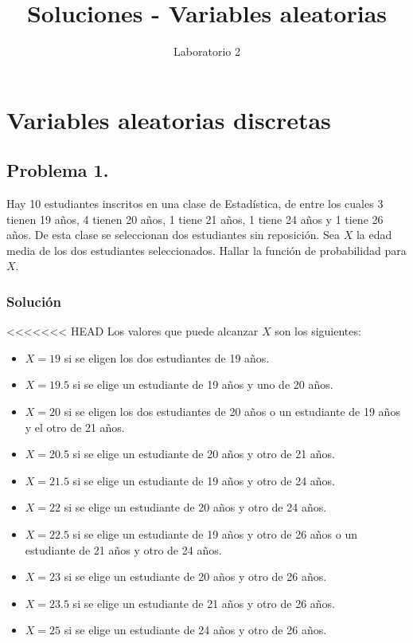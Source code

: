 \documentclass[
]{article}
\title{Soluciones - Variables aleatorias}
\author{}
\date{Laboratorio 2}
\providecommand{\tightlist}{%
  \setlength{\itemsep}{0pt}\setlength{\parskip}{0pt}}
\begin{document}
\maketitle

{
\hypersetup{linkcolor=blue}
\setcounter{tocdepth}{4}
\tableofcontents
}
\hypertarget{variables-aleatorias-discretas}{%
\section{Variables aleatorias
discretas}\label{variables-aleatorias-discretas}}

\hypertarget{problema-1.}{%
\subsection{Problema 1.}\label{problema-1.}}

Hay 10 estudiantes inscritos en una clase de Estadística, de entre los
cuales 3 tienen 19 años, 4 tienen 20 años, 1 tiene 21 años, 1 tiene 24
años y 1 tiene 26 años. De esta clase se seleccionan dos estudiantes sin
reposición. Sea \(X\) la edad media de los dos estudiantes
seleccionados. Hallar la función de probabilidad para \(X\).

\hypertarget{soluciuxf3n}{%
\subsubsection{Solución}\label{soluciuxf3n}}

\textless\textless\textless\textless\textless\textless\textless{} HEAD
Los valores que puede alcanzar \(X\) son los siguientes:

\begin{itemize}
\tightlist
\item
  \(X=19\) si se eligen los dos estudiantes de 19 años.
\item
  \(X=19.5\) si se elige un estudiante de 19 años y uno de 20 años.
\item
  \(X=20\) si se eligen los dos estudiantes de 20 años o un estudiante
  de 19 años y el otro de 21 años.
\item
  \(X=20.5\) si se elige un estudiante de 20 años y otro de 21 años.
\item
  \(X=21.5\) si se elige un estudiante de 19 años y otro de 24 años.
\item
  \(X=22\) si se elige un estudiante de 20 años y otro de 24 años.
\item
  \(X=22.5\) si se elige un estudiante de 19 años y otro de 26 años o un
  estudiante de 21 años y otro de 24 años.
\item
  \(X=23\) si se elige un estudiante de 20 años y otro de 26 años.
\item
  \(X=23.5\) si se elige un estudiante de 21 años y otro de 26 años.
\item
  \(X=25\) si se elige un estudiante de 24 años y otro de 26 años.
\end{itemize}
\end{document}
